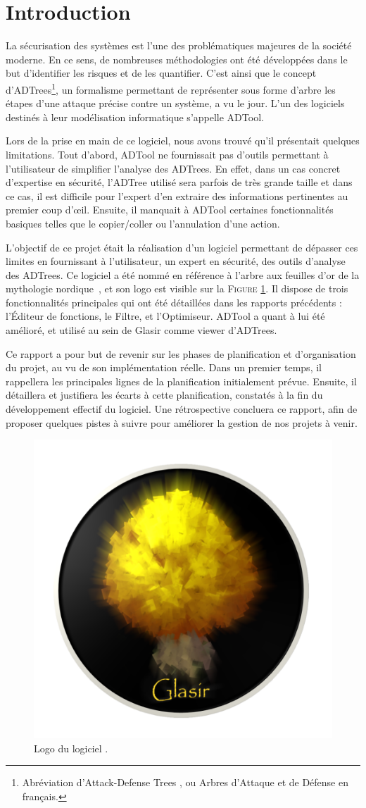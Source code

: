 \section{Introduction}
\label{sec:intro}

	La sécurisation des systèmes est l'une des problématiques majeures de la société moderne. En ce sens, de nombreuses méthodologies ont été développées dans le but d'identifier les risques et de les quantifier. C'est ainsi que le concept d'ADTrees\footnote{Abréviation d'\og Attack-Defense Trees \fg{}, ou \og Arbres d'Attaque et de Défense\fg{} en français.}, un formalisme permettant de représenter sous forme d'arbre les étapes d'une attaque précise contre un système, a vu le jour. L'un des logiciels destinés à leur modélisation informatique s'appelle ADTool.

    Lors de la prise en main de ce logiciel, nous avons trouvé qu'il présentait quelques limitations. Tout d'abord, ADTool ne fournissait pas d'outils permettant à l'utilisateur de simplifier l'analyse des ADTrees. En effet, dans un cas concret d'expertise en sécurité, l'ADTree utilisé sera parfois de très grande taille et dans ce cas, il est difficile pour l'expert d'en extraire des informations pertinentes au premier coup d’œil. Ensuite, il manquait à ADTool certaines fonctionnalités \og basiques \fg{} telles que le copier/coller ou l'annulation d'une action. 

    L'objectif de ce projet était la réalisation d'un logiciel permettant de dépasser ces limites en fournissant à l'utilisateur, un expert en sécurité, des outils d'analyse des ADTrees. Ce logiciel a été nommé \glasir{} en référence à l'arbre aux feuilles d'or de la mythologie nordique~\cite{vikingCulture}, et son logo est visible sur la \textsc{Figure} \ref{fig:glasir}. Il dispose de trois fonctionnalités principales qui ont été détaillées dans les rapports précédents : l'Éditeur de fonctions, le Filtre, et l'Optimiseur. ADTool a quant à lui été amélioré, et utilisé au sein de Glasir comme viewer d'ADTrees.

    Ce rapport a pour but de revenir sur les phases de planification et d'organisation du projet, au vu de son implémentation réelle. Dans un premier temps, il rappellera les principales lignes de la planification initialement prévue. Ensuite, il détaillera et justifiera les écarts à cette planification, constatés à la fin du développement effectif du logiciel. Une rétrospective concluera ce rapport, afin de proposer quelques pistes à suivre pour améliorer la gestion de nos projets à venir.

    \begin{figure}[h!]
        \centering
        \includegraphics[height=0.4\textwidth]{figure/glasir.png}
        \caption{Logo du logiciel \glasir{}.}
        \label{fig:glasir}
    \end{figure}